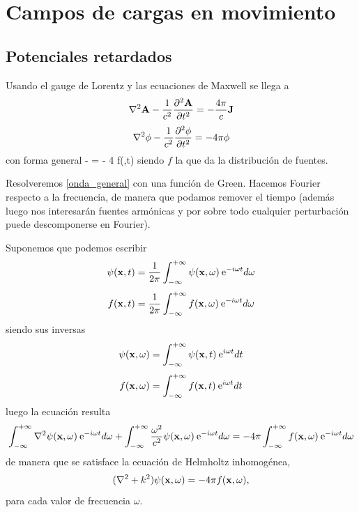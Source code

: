 \documentclass[10pt,oneside]{CBFT_book}
\begin{document}
\chapter{Campos de cargas en movimiento}

\section{Potenciales retardados}

Usando el gauge de Lorentz y las ecuaciones de Maxwell se llega a
\[
	\lapm{\vb{A}} - \frac{1}{c^2} \dpar[2]{\vb{A}}{t} = -\frac{4\pi}{c} \vb{J}
\]
\[
	\lapm{\phi} - \frac{1}{c^2} \dpar[2]{\phi}{t} = - 4 \pi \phi
\]
con forma general 
\be
	\lapm{\psi} -   = - 4 \pi f(,t)
	\label{onda_general}
\ee
siendo $f$ la que da la distribución de fuentes.

Resolveremos \eqref{onda_general} con una función de Green. Hacemos Fourier respecto a la frecuencia, de
manera que podamos remover el tiempo (además luego nos interesarán fuentes armónicas y por sobre todo
cualquier perturbación puede descomponerse en Fourier).

Suponemos que podemos escribir
\[
	\psi(\vb{x},t) = \frac{1}{2\pi}\int_{-\infty}^{+\infty} \psi(\vb{x},\omega) \euler^{-i\omega t} 
	d\omega
\]
\[
	f(\vb{x},t) = \frac{1}{2\pi}\int_{-\infty}^{+\infty} f(\vb{x},\omega) \euler^{-i\omega t} d\omega
\]
siendo sus inversas
\[
	\psi(\vb{x},\omega) = \int_{-\infty}^{+\infty} \psi(\vb{x}, t) \euler^{i\omega t} dt
\]
\[
	f(\vb{x},\omega) = \int_{-\infty}^{+\infty} f(\vb{x},t) \euler^{i\omega t} dt
\]
luego la ecuación resulta 
\[
	\int_{-\infty}^{+\infty} \lapm{\psi}(\vb{x},\omega) \euler^{ -i\omega t} d\omega +
	\int_{-\infty}^{+\infty} \frac{\omega^2}{c^2}\psi(\vb{x},\omega) \euler^{ -i\omega t} d\omega = 
		- 4 \pi \int_{-\infty}^{+\infty} f(\vb{x},\omega) \euler^{ -i\omega t} d\omega
\]
de manera que se satisface la ecuación de Helmholtz inhomogénea,
\[
	(\nabla^2 + k^2)\psi(\vb{x},\omega) = - 4\pi f(\vb{x},\omega),
\]
para cada valor de frecuencia $\omega$.
\end{document}
